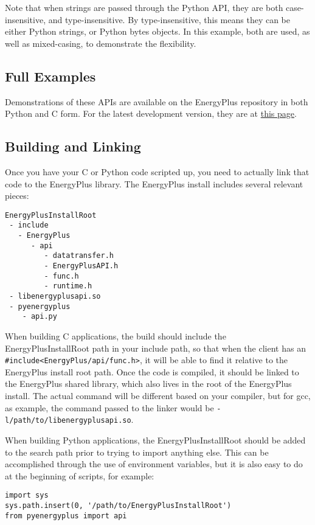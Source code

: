 Note that when strings are passed through the Python API, they are both case-insensitive, and type-insensitive.
By type-insensitive, this means they can be either Python strings, or Python bytes objects.
In this example, both are used, as well as mixed-casing, to demonstrate the flexibility.

\subsection{Full Examples}\label{subsec:full-examples}

Demonstrations of these APIs are available on the EnergyPlus repository in both Python and C form.
For the latest development version, they are at \href{https://github.com/NREL/EnergyPlus/tree/develop/tst/EnergyPlus/api}{this page}.

\subsection{Building and Linking}\label{subsec:building-and-linking}
Once you have your C or Python code scripted up, you need to actually link that code to the EnergyPlus library.
The EnergyPlus install includes several relevant pieces:

\begin{lstlisting}
EnergyPlusInstallRoot
 - include
   - EnergyPlus
      - api
         - datatransfer.h
         - EnergyPlusAPI.h
         - func.h
         - runtime.h
 - libenergyplusapi.so
 - pyenergyplus
    - api.py
\end{lstlisting}

When building C applications, the build should include the EnergyPlusInstallRoot path in your include path, so that when the client has an \verb=#include<EnergyPlus/api/func.h>=, it will be able to find it relative to the EnergyPlus install root path.
Once the code is compiled, it should be linked to the EnergyPlus shared library, which also lives in the root of the EnergyPlus install.
The actual command will be different based on your compiler, but for gcc, as example, the command passed to the linker would be \verb=-l/path/to/libenergyplusapi.so=.

When building Python applications, the EnergyPlusInstallRoot should be added to the search path prior to trying to import anything else.
This can be accomplished through the use of environment variables, but it is also easy to do at the beginning of scripts, for example:

\begin{verbatim}
import sys
sys.path.insert(0, '/path/to/EnergyPlusInstallRoot')
from pyenergyplus import api
\end{verbatim}
